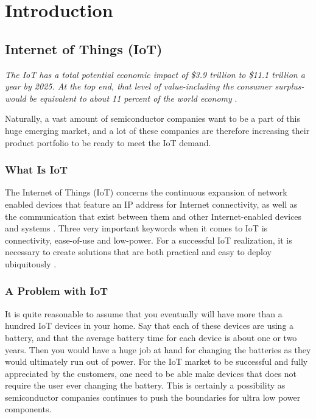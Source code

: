 \chapter{Introduction}

\section{Internet of Things (IoT)}

\textit{The IoT has a total potential economic impact of \$3.9 trillion to \$11.1 trillion a year by 2025. At the top end, that level of value-including the consumer surplus-would be equivalent to about 11 percent of the world economy} \cite{mckinsey15}.

Naturally, a vast amount of semiconductor companies want to be a part of this huge emerging market, and a lot of these companies are therefore increasing their product portfolio to be ready to meet the IoT demand. 

\subsection{What Is IoT}

The Internet of Things (IoT) concerns the continuous expansion of network enabled devices that feature an IP address for Internet connectivity, as well as the communication that exist between them and other Internet-enabled devices and systems \cite{webopedia}. Three very important keywords when it comes to IoT is connectivity, ease-of-use and low-power. For a successful IoT realization, it is necessary to create solutions that are both practical and easy to deploy ubiquitously \cite{embedded_IoT}. %

\subsection{A Problem with IoT}

It is quite reasonable to assume that you eventually will have more than a hundred IoT devices in your home. Say that each of these devices are using a battery, and that the average battery time for each device is about one or two years. Then you would have a huge job at hand for changing the batteries as they would ultimately run out of power. For the IoT market to be successful and fully appreciated by the customers, one need to be able make devices that does not require the user ever changing the battery. This is certainly a possibility as semiconductor companies continues to push the boundaries for ultra low power components.  

